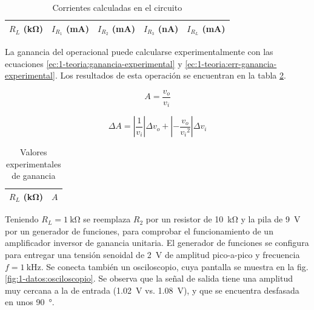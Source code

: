 \begin{table}[H]
    \centering
    \begin{tabular}{@{}rrrrr@{}}
        \toprule
        $R_L$ (\si{\kilo\ohm}) & $I_{R_1}$ (\si{\milli\ampere}) & $I_{R_2}$ (\si{\milli\ampere}) & $I_{R_3}$ (\si{\nano\ampere}) & $I_{R_L}$ (\si{\milli\ampere}) \\
        \midrule
        
    \end{tabular}
    \caption{Corrientes calculadas en el circuito}
    \label{tab:1-datos:corrientes}
\end{table}

La ganancia del operacional puede calcularse experimentalmente con las
ecuaciones \ref{ec:1-teoria:ganancia-experimental} y
\ref{ec:1-teoria:err-ganancia-experimental}. Los resultados de esta
operación se encuentran en la tabla \ref{tab:1-teoria:ganancia-experimental}.

\begin{equation}
    \label{ec:1-teoria:ganancia-experimental}
    A = \frac{v_o}{v_i}
\end{equation}

\begin{equation}
    \label{ec:1-teoria:err-ganancia-experimental}
    \Delta A = \left| \frac{1}{v_i} \right| \Delta v_o + \left| -\frac{v_o}{{v_i}^2} \right| \Delta v_i
\end{equation}

\begin{table}[H]
    \centering
    \begin{tabular}{@{}rr@{}}
        \toprule
        $R_L$ (\si{\kilo\ohm}) & $A$ \\
        \midrule
        
    \end{tabular}
    \caption{Valores experimentales de ganancia}
    \label{tab:1-teoria:ganancia-experimental}
\end{table}

Teniendo $R_L = \SI{1}{\kilo\ohm}$ se reemplaza $R_2$ por un resistor de 
\SI{10}{\kilo\ohm} y la pila de \SI{9}{\volt} por
un generador de funciones, para comprobar el funcionamiento de un amplificador
inversor de ganancia unitaria. El generador de funciones se configura para
entregar una tensión senoidal de \SI{2}{\volt} de amplitud pico-a-pico y
frecuencia $f = \SI{1}{\kilo\hertz}$.
Se conecta también un osciloscopio, cuya pantalla
se muestra en la fig. \ref{fig:1-datos:osciloscopio}. Se observa que la señal
de salida tiene una amplitud muy cercana a la de entrada (\SI{1.02}{\volt} vs.
\SI{1.08}{\volt}), y que se encuentra desfasada en unos \SI{90}{\degree}.

